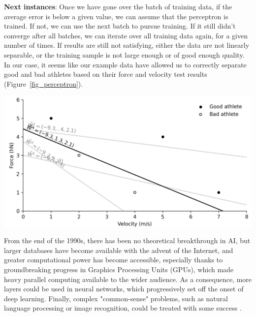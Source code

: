 \begin{tcolorbox}[nofloat, colback=white,colframe=black, colbacktitle=white, coltitle=black, breakable, title=\textbf{Example 1} Athlete classification with a perceptron, label=example1]
      \textbf{Next instances}: Once we have gone over the batch of training data, if the average error is below a given value, we can assume that the perceptron is trained. If not, we can use the next batch to pursue training. If it still didn't converge after all batches, we can iterate over all training data again, for a given number of times. If results are still not satisfying, either the data are not linearly separable, or the training sample is not large enough or of good enough quality. In our case, it seems like our example data have allowed us to correctly separate good and bad athletes based on their force and velocity test results (Figure~\ref{fig_perceptron}).

      {
      \begin{center}
      \def\svgwidth{1\columnwidth}
      \fontsize{10pt}{10pt}\selectfont
      \centerline{\includegraphics[width=0.9\linewidth]{"../Chap2/Figures/Fig_perceptron.png"}}
      \label{fig_perceptron}
      \end{center}
      }
\end{tcolorbox}

\newpage

From the end of the 1990s, there has been no theoretical breakthrough in AI, but larger databases have become available with the advent of the Internet, and greater computational power has become accessible, especially thanks to groundbreaking progress in Graphics Processing Units (GPUs), which made heavy parallel computing available to the wider audience. As a consequence, more layers could be used in neural networks, which progressively set off the onset of deep learning. Finally, complex "common-sense" problems, such as natural language processing or image recognition, could be treated with some success \cite{Baral2018}.

